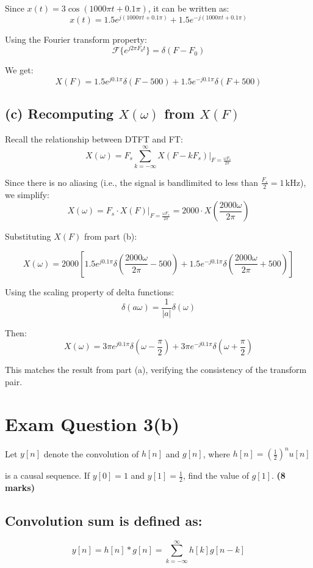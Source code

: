 \documentclass[12pt]{article}
\begin{document}
	Since \( x(t) = 3 \cos(1000\pi t + 0.1\pi) \), it can be written as:
	\[
	x(t) = 1.5 e^{j(1000\pi t + 0.1\pi)} + 1.5 e^{-j(1000\pi t + 0.1\pi)}
	\]
	
	Using the Fourier transform property:
	\[
	\mathcal{F}\{e^{j2\pi F_0 t}\} = \delta(F - F_0)
	\]
	
	We get:
	\[
	X(F) = 1.5 e^{j0.1\pi} \delta(F - 500) + 1.5 e^{-j0.1\pi} \delta(F + 500)
	\]
	
	\subsection*{(c) Recomputing \( X(\omega) \) from \( X(F) \)}
	
	Recall the relationship between DTFT and FT:
	\[
	X(\omega) = F_s \sum_{k=-\infty}^{\infty} X(F - kF_s) \bigg|_{F = \frac{\omega F_s}{2\pi}}
	\]
	
	Since there is no aliasing (i.e., the signal is bandlimited to less than \( \frac{F_s}{2} = 1\,\text{kHz} \)), we simplify:
	\[
	X(\omega) = F_s \cdot X(F) \bigg|_{F = \frac{\omega F_s}{2\pi}} = 2000 \cdot X\left(\frac{2000 \omega}{2\pi}\right)
	\]
	
	Substituting \( X(F) \) from part (b):
	
	\[
	X(\omega) = 2000 \left[1.5 e^{j0.1\pi} \delta\left(\frac{2000 \omega}{2\pi} - 500\right) + 1.5 e^{-j0.1\pi} \delta\left(\frac{2000 \omega}{2\pi} + 500\right)\right]
	\]
	
	Using the scaling property of delta functions:
	\[
	\delta(a\omega) = \frac{1}{|a|} \delta(\omega)
	\]
	
	Then:
	\[
	X(\omega) = 3\pi e^{j0.1\pi} \delta\left(\omega - \frac{\pi}{2}\right) + 3\pi e^{-j0.1\pi} \delta\left(\omega + \frac{\pi}{2}\right)
	\]
	
	\noindent This matches the result from part (a), verifying the consistency of the transform pair.
	
	
	
	
	\section*{Exam Question 3(b)}
	
	Let \( y[n] \) denote the convolution of \( h[n] \) and \( g[n] \), where
	\(h[n] = \left(\frac{1}{2}\right)^n u[n]  \)

	is a causal sequence. If \( y[0] = 1 \) and \( y[1] = \frac{1}{2} \), find the value of \( g[1] \).  \textbf{(8 marks)}
	
	\subsection*{Convolution sum is defined as:}
	\[
	y[n] = h[n] * g[n] = \sum_{k=-\infty}^{\infty} h[k] g[n-k]
	\]
	
\end{document}
